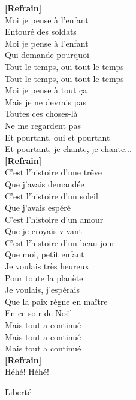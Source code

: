 \documentclass{novel}
\begin{document}
\begin{multicols}{2}
\textbf{[Refrain]} \\

Moi je pense à l'enfant \\
Entouré des soldats \\
Moi je pense à l'enfant \\
Qui demande pourquoi \\
Tout le temps, oui tout le temps \\
Tout le temps, oui tout le temps \\
Moi je pense à tout ça \\
Mais je ne devrais pas \\
Toutes ces choses-là \\
Ne me regardent pas \\
Et pourtant, oui et pourtant \\
Et pourtant, je chante, je chante... \\

\textbf{[Refrain]} \\

C'est l'histoire d'une trêve \\
Que j'avais demandée \\
C'est l'histoire d'un soleil \\
Que j'avais espéré \\
C'est l'histoire d'un amour \\
Que je croyais vivant \\
C'est l'histoire d'un beau jour \\
Que moi, petit enfant \\
Je voulais très heureux \\
Pour toute la planète \\
Je voulais, j'espérais \\
Que la paix règne en maître \\
En ce soir de Noël \\
Mais tout a continué \\
Mais tout a continué \\
Mais tout a continué \\

\textbf{[Refrain]} \\

Héhé! Héhé!
\end{multicols}

\newpage
\normalsize

\h*{Liberté}
\end{document}
